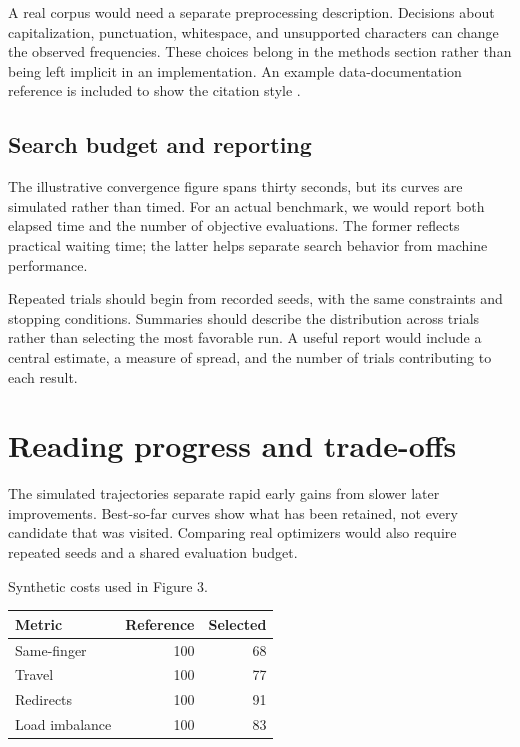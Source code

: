 \documentclass{gecko-paper}
\begin{document}
\begin{paperbody}
A real corpus would need a separate preprocessing description. Decisions about capitalization, punctuation, whitespace, and unsupported characters can change the observed frequencies. These choices belong in the methods section rather than being left implicit in an implementation. An example data-documentation reference is included to show the citation style .

\subsection{Search budget and reporting}

The illustrative convergence figure spans thirty seconds, but its curves are simulated rather than timed. For an actual benchmark, we would report both elapsed time and the number of objective evaluations. The former reflects practical waiting time; the latter helps separate search behavior from machine performance.

Repeated trials should begin from recorded seeds, with the same constraints and stopping conditions. Summaries should describe the distribution across trials rather than selecting the most favorable run. A useful report would include a central estimate, a measure of spread, and the number of trials contributing to each result.

\section{Reading progress and trade-offs}
The simulated trajectories separate rapid early gains from slower later improvements. Best-so-far curves show what has been retained, not every candidate that was visited. Comparing real optimizers would also require repeated seeds and a shared evaluation budget.


\begin{papertable}{Synthetic costs used in Figure 3.}
\begin{tabular*}{\linewidth}{@{\extracolsep{\fill}}lrr@{}}
\toprule
Metric & Reference & Selected\\
\midrule
Same-finger & 100 & 68\\
Travel & 100 & 77\\
Redirects & 100 & 91\\
Load imbalance & 100 & 83\\
\bottomrule
\end{tabular*}
\end{papertable}


\end{paperbody}
\end{document}
